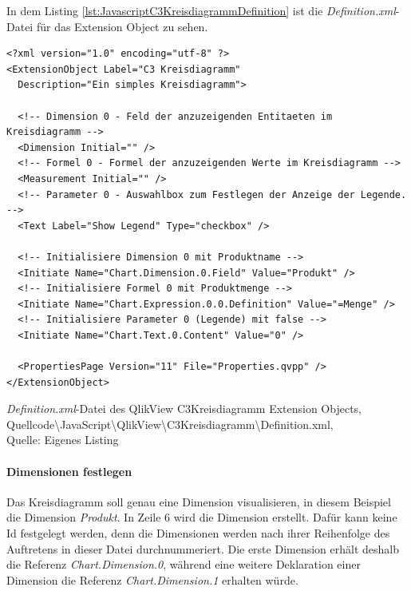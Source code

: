 In dem Listing \ref{lst:JavascriptC3KreisdiagrammDefinition} ist die \textit{Definition.xml}-Datei für das Extension Object zu sehen.


\ifIncludeFigures\begin{listing}[htbp]
\begin{verbatim}
<?xml version="1.0" encoding="utf-8" ?>
<ExtensionObject Label="C3 Kreisdiagramm"
  Description="Ein simples Kreisdiagramm">

  <!-- Dimension 0 - Feld der anzuzeigenden Entitaeten im Kreisdiagramm -->
  <Dimension Initial="" />
  <!-- Formel 0 - Formel der anzuzeigenden Werte im Kreisdiagramm -->
  <Measurement Initial="" />
  <!-- Parameter 0 - Auswahlbox zum Festlegen der Anzeige der Legende. -->
  <Text Label="Show Legend" Type="checkbox" />

  <!-- Initialisiere Dimension 0 mit Produktname -->
  <Initiate Name="Chart.Dimension.0.Field" Value="Produkt" />
  <!-- Initialisiere Formel 0 mit Produktmenge -->
  <Initiate Name="Chart.Expression.0.0.Definition" Value="=Menge" />
  <!-- Initialisiere Parameter 0 (Legende) mit false -->
  <Initiate Name="Chart.Text.0.Content" Value="0" />

  <PropertiesPage Version="11" File="Properties.qvpp" />
</ExtensionObject>
\end{verbatim}
\caption[\textit{Definition.xml}-Datei des QlikView C3Kreisdiagramm Extension Objects]{\textit{Definition.xml}-Datei des QlikView C3Kreisdiagramm Extension Objects, \\Quellcode\textbackslash{}JavaScript\textbackslash{}QlikView\textbackslash{}C3Kreisdiagramm\textbackslash{}Definition.xml, \\Quelle: Eigenes Listing}
\label{lst:JavascriptC3KreisdiagrammDefinition}
\end{listing}\fi

\paragraph{Dimensionen festlegen}

Das Kreisdiagramm soll genau eine Dimension visualisieren, in diesem Beispiel die Dimension \textit{Produkt}. In Zeile 6 wird die Dimension erstellt. Dafür kann keine Id festgelegt werden, denn die Dimensionen werden nach ihrer Reihenfolge des Auftretens in dieser Datei durchnummeriert. Die erste Dimension erhält deshalb die Referenz \textit{Chart.Dimension.0}, während eine weitere Deklaration einer Dimension die Referenz \textit{Chart.Dimension.1} erhalten würde.

